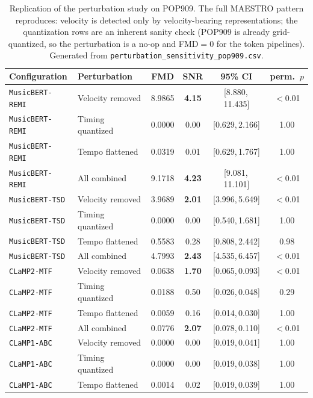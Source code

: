 \documentclass[11pt]{article}
\begin{document}
\begin{table}[t]
\centering
\caption{Replication of the perturbation study on POP909. The full MAESTRO
pattern reproduces: velocity is detected only by velocity-bearing
representations; the quantization rows are an inherent sanity check (POP909
is already grid-quantized, so the perturbation is a no-op and FMD$=0$ for
the token pipelines). Generated from
\texttt{perturbation\_sensitivity\_pop909.csv}.}
\label{tab:pertrep}
\small
\begin{tabular}{@{}llcccc@{}}
\toprule
Configuration & Perturbation & FMD & SNR & 95\% CI & perm.\ $p$ \\
\midrule
\texttt{MusicBERT-REMI} & Velocity removed & 8.9865 & \textbf{4.15} & [8.880,\,11.435] & $<$0.01 \\
\texttt{MusicBERT-REMI} & Timing quantized & 0.0000 & {0.00} & [0.629,\,2.166] & 1.00 \\
\texttt{MusicBERT-REMI} & Tempo flattened & 0.0319 & {0.01} & [0.629,\,1.767] & 1.00 \\
\texttt{MusicBERT-REMI} & All combined & 9.1718 & \textbf{4.23} & [9.081,\,11.101] & $<$0.01 \\
\addlinespace
\texttt{MusicBERT-TSD} & Velocity removed & 3.9689 & \textbf{2.01} & [3.996,\,5.649] & $<$0.01 \\
\texttt{MusicBERT-TSD} & Timing quantized & 0.0000 & {0.00} & [0.540,\,1.681] & 1.00 \\
\texttt{MusicBERT-TSD} & Tempo flattened & 0.5583 & {0.28} & [0.808,\,2.442] & 0.98 \\
\texttt{MusicBERT-TSD} & All combined & 4.7993 & \textbf{2.43} & [4.535,\,6.457] & $<$0.01 \\
\addlinespace
\texttt{CLaMP2-MTF} & Velocity removed & 0.0638 & \textbf{1.70} & [0.065,\,0.093] & $<$0.01 \\
\texttt{CLaMP2-MTF} & Timing quantized & 0.0188 & {0.50} & [0.026,\,0.048] & 0.29 \\
\texttt{CLaMP2-MTF} & Tempo flattened & 0.0059 & {0.16} & [0.014,\,0.030] & 1.00 \\
\texttt{CLaMP2-MTF} & All combined & 0.0776 & \textbf{2.07} & [0.078,\,0.110] & $<$0.01 \\
\addlinespace
\texttt{CLaMP1-ABC} & Velocity removed & 0.0000 & {0.00} & [0.019,\,0.041] & 1.00 \\
\texttt{CLaMP1-ABC} & Timing quantized & 0.0000 & {0.00} & [0.019,\,0.038] & 1.00 \\
\texttt{CLaMP1-ABC} & Tempo flattened & 0.0014 & {0.02} & [0.019,\,0.039] & 1.00 \\

\end{tabular}
\end{table}
\end{document}
